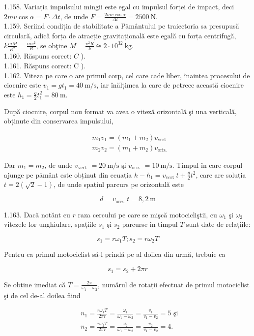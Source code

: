 \documentclass[10pt]{article}
\begin{document}
1.158. Variația impulsului mingii este egal cu impulsul forței de impact, deci $2 m v \cos \alpha=F \cdot \Delta t$, de unde $F=\frac{2 m v \cos \alpha}{\Delta t}=2500 \mathrm{~N}$.\\
1.159. Scriind condiția de stabilitate a Pământului pe traiectoria sa presupusă circulară, adică forța de atracție gravitațională este egală cu forța centrifugă, $k \frac{m M}{R^{2}}=\frac{m v^{2}}{R}$, se obţine $M=\frac{v^{2} R}{k} \cong 2 \cdot 10^{32} \mathrm{~kg}$.\\
1.160. Răspuns corect: $C$ ).\\
1.161. Răspuns corect: C ).\\
1.162. Viteza pe care o are primul corp, cel care cade liber, înaintea procesului de ciocnire este $v_{1}=g t_{1}=40 \mathrm{~m} / \mathrm{s}$, iar înălțimea la care de petrece această ciocnire este $h_{1}=\frac{g}{2} t_{1}^{2}=80 \mathrm{~m}$.

După ciocnire, corpul nou format va avea o viteză orizontală şi una verticală, obținute din conservarea impulsului,

$$
\begin{aligned}
& m_{1} v_{1}=\left(m_{1}+m_{2}\right) v_{\text {vert }} \\
& m_{2} v_{2}=\left(m_{1}+m_{2}\right) v_{\text {oriz. }}
\end{aligned}
$$

Dar $m_{1}=m_{2}$, de unde $v_{\text {vert. }}=20 \mathrm{~m} / \mathrm{s}$ şi $v_{\text {oriz. }}=10 \mathrm{~m} / \mathrm{s}$. Timpul în care corpul ajunge pe pământ este obținut din ecuația $h-h_{1}=v_{\text {vert }} t+\frac{g}{2} t^{2}$, care are soluția $t=2(\sqrt{2}-1)$, de unde spațiul parcurs pe orizontală este

$$
d=v_{\text {oriz. }} t=8,2 \mathrm{~m}
$$

1.163. Dacă notănt cu $r$ raza cercului pe care se mişcă motocicliştii, cu $\omega_{1}$ şi $\omega_{2}$ vitezele lor unghiulare, spațiile $s_{1}$ şi $s_{2}$ parcurse in timpul $T$ sunt date de relațiile:

$$
s_{1}=r \omega_{1} T ; s_{2}=r \omega_{2} T
$$

Pentru ca primul motociclist să-l prindă pe al doilea din urmă, trebuie ca

$$
s_{1}=s_{2}+2 \pi r
$$

Se obține imediat că $T=\frac{2 \pi}{\omega_{1}-\omega_{2}}$, numărul de rotații efectuat de primul motociclist şi de cel de-al doilea fiind

$$
\begin{aligned}
& n_{1}=\frac{r \omega_{1} T}{2 \pi r}=\frac{\omega_{1}}{\omega_{1}-\omega_{2}}=\frac{v_{1}}{v_{1}-v_{2}}=5 \text { şi } \\
& n_{2}=\frac{r \omega_{2} T}{2 \pi r}=\frac{\omega_{2}}{\omega_{1}-\omega_{2}}=\frac{v_{2}}{v_{1}-v_{2}}=4 .
\end{aligned}
$$
\end{document}
